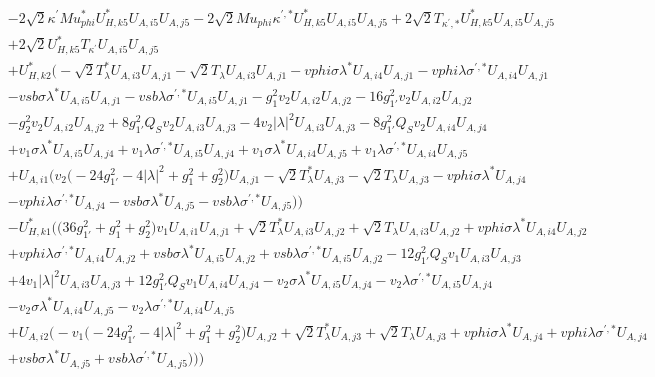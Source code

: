 \begin{align}
 &-2 \sqrt{2} \kappa^\prime Mu_{phi}^* U^*_{{H},{k 5}} U_{A,{i 5}} U_{A,{j 5}} -2 \sqrt{2} Mu_{phi} \kappa^{\prime,*} U^*_{{H},{k 5}} U_{A,{i 5}} U_{A,{j 5}} +2 \sqrt{2} T_{\kappa^{\prime},*} U^*_{{H},{k 5}} U_{A,{i 5}} U_{A,{j 5}} \nonumber \\ 
 &+2 \sqrt{2} U^*_{{H},{k 5}} T_{\kappa^\prime} U_{A,{i 5}} U_{A,{j 5}} \nonumber \\ 
 &+U^*_{{H},{k 2}} \Big(- \sqrt{2} T_{\lambda}^* U_{A,{i 3}} U_{A,{j 1}} - \sqrt{2} T_{\lambda} U_{A,{i 3}} U_{A,{j 1}} - vphi \sigma \lambda^* U_{A,{i 4}} U_{A,{j 1}} - vphi \lambda \sigma^{\prime,*} U_{A,{i 4}} U_{A,{j 1}} \nonumber \\ 
 &- vsb \sigma \lambda^* U_{A,{i 5}} U_{A,{j 1}} - vsb \lambda \sigma^{\prime,*} U_{A,{i 5}} U_{A,{j 1}} - g_{1}^{2} v_2 U_{A,{i 2}} U_{A,{j 2}} -16 g_{1'}^{2} v_2 U_{A,{i 2}} U_{A,{j 2}} \nonumber \\ 
 &- g_{2}^{2} v_2 U_{A,{i 2}} U_{A,{j 2}} +8 g_{1'}^{2} Q_{S} v_2 U_{A,{i 3}} U_{A,{j 3}} -4 v_2 |\lambda|^2 U_{A,{i 3}} U_{A,{j 3}} -8 g_{1'}^{2} Q_{S} v_2 U_{A,{i 4}} U_{A,{j 4}} \nonumber \\ 
 &+v_1 \sigma \lambda^* U_{A,{i 5}} U_{A,{j 4}} +v_1 \lambda \sigma^{\prime,*} U_{A,{i 5}} U_{A,{j 4}} +v_1 \sigma \lambda^* U_{A,{i 4}} U_{A,{j 5}} +v_1 \lambda \sigma^{\prime,*} U_{A,{i 4}} U_{A,{j 5}} \nonumber \\ 
 &+U_{A,{i 1}} \Big(v_2 \Big(-24 g_{1'}^{2}  -4 |\lambda|^2  + g_{1}^{2} + g_{2}^{2}\Big)U_{A,{j 1}} - \sqrt{2} T_{\lambda}^* U_{A,{j 3}} - \sqrt{2} T_{\lambda} U_{A,{j 3}} - vphi \sigma \lambda^* U_{A,{j 4}} \nonumber \\ 
 &- vphi \lambda \sigma^{\prime,*} U_{A,{j 4}} - vsb \sigma \lambda^* U_{A,{j 5}} - vsb \lambda \sigma^{\prime,*} U_{A,{j 5}} \Big)\Big)\nonumber \\ 
 &- U^*_{{H},{k 1}} \Big(\Big(36 g_{1'}^{2}  + g_{1}^{2} + g_{2}^{2}\Big)v_1 U_{A,{i 1}} U_{A,{j 1}} +\sqrt{2} T_{\lambda}^* U_{A,{i 3}} U_{A,{j 2}} +\sqrt{2} T_{\lambda} U_{A,{i 3}} U_{A,{j 2}} +vphi \sigma \lambda^* U_{A,{i 4}} U_{A,{j 2}} \nonumber \\ 
 &+vphi \lambda \sigma^{\prime,*} U_{A,{i 4}} U_{A,{j 2}} +vsb \sigma \lambda^* U_{A,{i 5}} U_{A,{j 2}} +vsb \lambda \sigma^{\prime,*} U_{A,{i 5}} U_{A,{j 2}} -12 g_{1'}^{2} Q_{S} v_1 U_{A,{i 3}} U_{A,{j 3}} \nonumber \\ 
 &+4 v_1 |\lambda|^2 U_{A,{i 3}} U_{A,{j 3}} +12 g_{1'}^{2} Q_{S} v_1 U_{A,{i 4}} U_{A,{j 4}} - v_2 \sigma \lambda^* U_{A,{i 5}} U_{A,{j 4}} - v_2 \lambda \sigma^{\prime,*} U_{A,{i 5}} U_{A,{j 4}} \nonumber \\ 
 &- v_2 \sigma \lambda^* U_{A,{i 4}} U_{A,{j 5}} - v_2 \lambda \sigma^{\prime,*} U_{A,{i 4}} U_{A,{j 5}} \nonumber \\ 
 &+U_{A,{i 2}} \Big(- v_1 \Big(-24 g_{1'}^{2}  -4 |\lambda|^2  + g_{1}^{2} + g_{2}^{2}\Big)U_{A,{j 2}} +\sqrt{2} T_{\lambda}^* U_{A,{j 3}} +\sqrt{2} T_{\lambda} U_{A,{j 3}} +vphi \sigma \lambda^* U_{A,{j 4}} +vphi \lambda \sigma^{\prime,*} U_{A,{j 4}} \nonumber \\ 
 &+vsb \sigma \lambda^* U_{A,{j 5}} +vsb \lambda \sigma^{\prime,*} U_{A,{j 5}} \Big)\Big)\Big)\end{align} 
